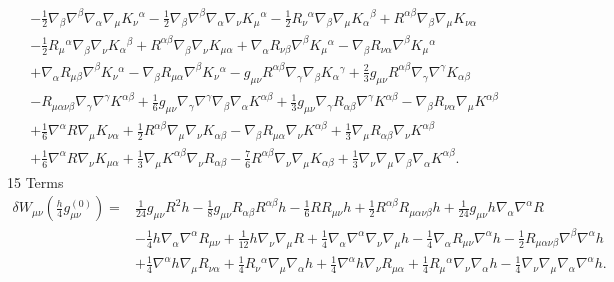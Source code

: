 \documentclass[10pt,letterpaper]{article}
\begin{document}
\begin{align}
& -  \tfrac{1}{2} \nabla_{\beta}\nabla^{\beta}\nabla_{\alpha}\nabla_{\mu}K_{\nu}{}^{\alpha}
 -  \tfrac{1}{2} \nabla_{\beta}\nabla^{\beta}\nabla_{\alpha}\nabla_{\nu}K_{\mu}{}^{\alpha}
 -  \tfrac{1}{2} R_{\nu}{}^{\alpha} \nabla_{\beta}\nabla_{\mu}K_{\alpha}{}^{\beta}
 + R^{\alpha \beta} \nabla_{\beta}\nabla_{\mu}K_{\nu \alpha}\nonumber\\
& -  \tfrac{1}{2} R_{\mu}{}^{\alpha} \nabla_{\beta}\nabla_{\nu}K_{\alpha}{}^{\beta}
 + R^{\alpha \beta} \nabla_{\beta}\nabla_{\nu}K_{\mu \alpha}
 + \nabla_{\alpha}R_{\nu \beta} \nabla^{\beta}K_{\mu}{}^{\alpha}
 -  \nabla_{\beta}R_{\nu \alpha} \nabla^{\beta}K_{\mu}{}^{\alpha}\nonumber\\
& + \nabla_{\alpha}R_{\mu \beta} \nabla^{\beta}K_{\nu}{}^{\alpha}
 -  \nabla_{\beta}R_{\mu \alpha} \nabla^{\beta}K_{\nu}{}^{\alpha}
 -  g_{\mu \nu} R^{\alpha \beta} \nabla_{\gamma}\nabla_{\beta}K_{\alpha}{}^{\gamma}
 + \tfrac{2}{3} g_{\mu \nu} R^{\alpha \beta} \nabla_{\gamma}\nabla^{\gamma}K_{\alpha \beta}\nonumber\\
& -  R_{\mu \alpha \nu \beta} \nabla_{\gamma}\nabla^{\gamma}K^{\alpha \beta}
 + \tfrac{1}{6} g_{\mu \nu} \nabla_{\gamma}\nabla^{\gamma}\nabla_{\beta}\nabla_{\alpha}K^{\alpha \beta}
 + \tfrac{1}{3} g_{\mu \nu} \nabla_{\gamma}R_{\alpha \beta} \nabla^{\gamma}K^{\alpha \beta}
 -  \nabla_{\beta}R_{\nu \alpha} \nabla_{\mu}K^{\alpha \beta}\nonumber\\
& + \tfrac{1}{6} \nabla^{\alpha}R \nabla_{\mu}K_{\nu \alpha}
 + \tfrac{1}{2} R^{\alpha \beta} \nabla_{\mu}\nabla_{\nu}K_{\alpha \beta}
 -  \nabla_{\beta}R_{\mu \alpha} \nabla_{\nu}K^{\alpha \beta}
 + \tfrac{1}{3} \nabla_{\mu}R_{\alpha \beta} \nabla_{\nu}K^{\alpha \beta}\nonumber\\
& + \tfrac{1}{6} \nabla^{\alpha}R \nabla_{\nu}K_{\mu \alpha}
 + \tfrac{1}{3} \nabla_{\mu}K^{\alpha \beta} \nabla_{\nu}R_{\alpha \beta}
 -  \tfrac{7}{6} R^{\alpha \beta} \nabla_{\nu}\nabla_{\mu}K_{\alpha \beta}
 + \tfrac{1}{3} \nabla_{\nu}\nabla_{\mu}\nabla_{\beta}\nabla_{\alpha}K^{\alpha \beta}.
\end{align}
15 Terms
\begin{align}
\delta W_{\mu\nu}(\tfrac{h}{4}g_{\mu\nu}^{(0)})={}&\tfrac{1}{24} g_{\mu \nu} R^2 h
 -  \tfrac{1}{8} g_{\mu \nu} R_{\alpha \beta} R^{\alpha \beta} h
 -  \tfrac{1}{6} R R_{\mu \nu} h
 + \tfrac{1}{2} R^{\alpha \beta} R_{\mu \alpha \nu \beta} h
 + \tfrac{1}{24} g_{\mu \nu} h \nabla_{\alpha}\nabla^{\alpha}R\nonumber\\
& -  \tfrac{1}{4} h \nabla_{\alpha}\nabla^{\alpha}R_{\mu \nu}
 + \tfrac{1}{12} h \nabla_{\nu}\nabla_{\mu}R+\tfrac{1}{4} \nabla_{\alpha}\nabla^{\alpha}\nabla_{\nu}\nabla_{\mu}h
 -  \tfrac{1}{4} \nabla_{\alpha}R_{\mu \nu} \nabla^{\alpha}h
 -  \tfrac{1}{2} R_{\mu \alpha \nu \beta} \nabla^{\beta}\nabla^{\alpha}h\nonumber \\
& + \tfrac{1}{4} \nabla^{\alpha}h \nabla_{\mu}R_{\nu \alpha}
 + \tfrac{1}{4} R_{\nu}{}^{\alpha} \nabla_{\mu}\nabla_{\alpha}h + \tfrac{1}{4} \nabla^{\alpha}h \nabla_{\nu}R_{\mu \alpha}
 + \tfrac{1}{4} R_{\mu}{}^{\alpha} \nabla_{\nu}\nabla_{\alpha}h
 -  \tfrac{1}{4} \nabla_{\nu}\nabla_{\mu}\nabla_{\alpha}\nabla^{\alpha}h.
\end{align}
\end{document}
